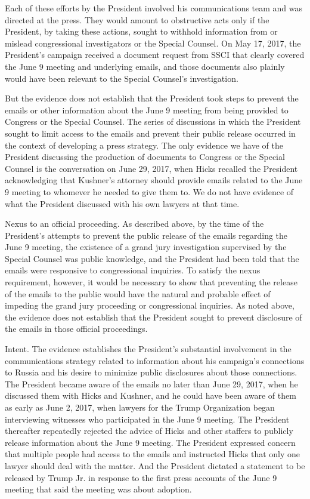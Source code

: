 Each of these efforts by the President involved his communications team and was directed at the press.
They would amount to obstructive acts only if the President, by taking these actions, sought to withhold information from or mislead congressional investigators or the Special Counsel.
On May 17, 2017, the President's campaign received a document request from SSCI that clearly covered the June 9 meeting and underlying emails, and those documents also plainly would have been relevant to the Special Counsel's investigation.

But the evidence does not establish that the President took steps to prevent the emails or other information about the June 9 meeting from being provided to Congress or the Special Counsel.
The series of discussions in which the President sought to limit access to the emails and prevent their public release occurred in the context of developing a press strategy.
The only evidence we have of the President discussing the production of documents to Congress or the Special Counsel is the conversation on June 29, 2017, when Hicks recalled the President acknowledging that Kushner's attorney should provide emails related to the June 9 meeting to whomever he needed to give them to.
We do not have evidence of what the President discussed with his own lawyers at that time.

Nexus to an official proceeding.
As described above, by the time of the President's attempts to prevent the public release of the emails regarding the June 9 meeting, the existence of a grand jury investigation supervised by the Special Counsel was public knowledge, and the President had been told that the emails were responsive to congressional inquiries.
To satisfy the nexus requirement, however, it would be necessary to show that preventing the release of the emails to the public would have the natural and probable effect of impeding the grand jury proceeding or congressional inquiries.
As noted above, the evidence does not establish that the President sought to prevent disclosure of the emails in those official proceedings.

Intent.
The evidence establishes the President's substantial involvement in the communications strategy related to information about his campaign's connections to Russia and his desire to minimize public disclosures about those connections.
The President became aware of the emails no later than June 29, 2017, when he discussed them with Hicks and Kushner, and he could have been aware of them as early as June 2, 2017, when lawyers for the Trump Organization began interviewing witnesses who participated in the June 9 meeting.
The President thereafter repeatedly rejected the advice of Hicks and other staffers to publicly release information about the June 9 meeting.
The President expressed concern that multiple people had access to the emails and instructed Hicks that only one lawyer should deal with the matter.
And the President dictated a statement to be released by Trump Jr. in response to the first press accounts of the June 9 meeting that said the meeting was about adoption.

